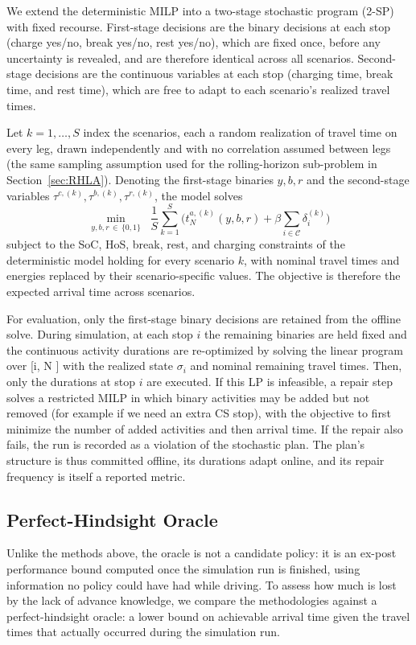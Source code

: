 \documentclass[preprint,12pt,3p]{elsarticle}
\begin{document}
We extend the deterministic MILP into a two-stage stochastic program (2-SP) with fixed recourse. First-stage decisions are the binary decisions at each stop (charge yes/no, break yes/no, rest yes/no), which are fixed once, before any uncertainty is revealed, and are therefore identical across all scenarios.
Second-stage decisions are the continuous variables at each stop (charging time, break time, and rest time), which are free to adapt to each scenario's realized travel times.

Let $k = 1, \ldots, S$ index the scenarios, each a random realization of travel time on every leg, drawn independently and with no correlation assumed between legs (the same sampling assumption used for the rolling-horizon sub-problem in Section~\ref{sec:RHLA}). Denoting the first-stage binaries $y, b, r$ and the second-stage variables $\tau^{c,(k)}, \tau^{b,(k)}, \tau^{r,(k)}$, the model solves
\[
  \min_{y,b,r \,\in\, \{0,1\}} \;\; \frac{1}{S}\sum_{k=1}^{S} \bigl(t^{a,(k)}_N(y,b,r) + \beta \sum_{i \in \mathcal C}\delta_i^{(k)}\bigr)
\]
subject to the SoC, HoS, break, rest, and charging constraints of the deterministic model holding for every scenario $k$, with nominal travel times and energies replaced by their scenario-specific values. The objective is therefore the expected arrival time across scenarios.

For evaluation, only the first-stage binary decisions are retained from the offline solve. During simulation, at each stop $i$ the remaining binaries are held fixed and the continuous activity durations are re-optimized by solving the linear program over [i, N ] with the realized state $\sigma_i$ and nominal remaining travel times. Then, only the durations at stop $i$ are executed. If this LP is infeasible, a repair step solves a restricted MILP in which binary activities may be added but not removed (for example if we need an extra CS stop), with the objective to first minimize the number of added activities and then arrival time. If the repair also fails, the run is recorded as a violation of the stochastic plan. The plan's structure is thus committed offline, its durations adapt online, and its repair frequency is itself a reported metric.



\subsection{Perfect-Hindsight Oracle} \label{sec:oracle}
Unlike the methods above, the oracle is not a candidate policy: it is an ex-post performance bound computed once the simulation run is finished, using information no policy could have had while driving.
To assess how much is lost by the lack of advance knowledge, we compare the methodologies against a perfect-hindsight oracle: a lower bound on achievable arrival time given the travel times that actually occurred during the simulation run.
\end{document}
